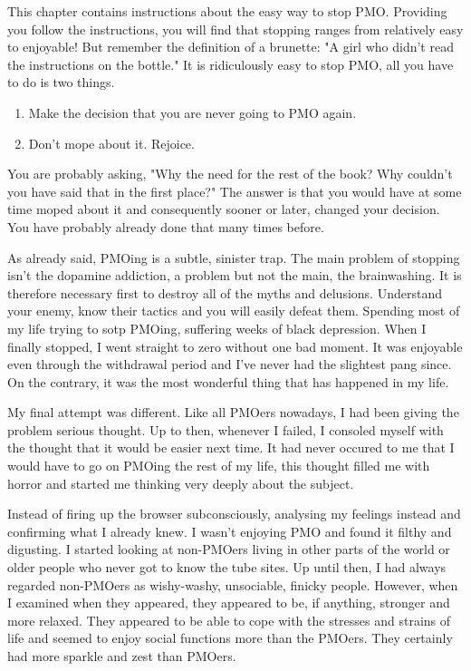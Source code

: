 \documentclass[easypeasy]{subfiles}
\begin{document}
This chapter contains instructions about the easy way to stop PMO. Providing you follow the instructions, you will find that stopping ranges from relatively easy to enjoyable! But remember the definition of a brunette: "A girl who didn't read the instructions on the bottle." It is ridiculously easy to stop PMO, all you have to do is two things.

\begin{enumerate}
  \item Make the decision that you are never going to PMO again.
  \item Don't mope about it. Rejoice.
\end{enumerate}

You are probably asking, "Why the need for the rest of the book? Why couldn't you have said that in the first place?" The answer is that you would have at some time moped about it and consequently sooner or later, changed your decision. You have probably already done that many times before.

As already said, PMOing is a subtle, sinister trap. The main problem of stopping isn't the dopamine addiction, a problem but not the main, the brainwashing. It is therefore necessary first to destroy all of the myths and delusions. Understand your enemy, know their tactics and you will easily defeat them. Spending most of my life trying to sotp PMOing, suffering weeks of black depression. When I finally stopped, I went straight to zero without one bad moment. It was enjoyable even through the withdrawal period and I've never had the slightest pang since. On the contrary, it was the most wonderful thing that has happened in my life.

My final attempt was different. Like all PMOers nowadays, I had been giving the problem serious thought. Up to then, whenever I failed, I consoled myself with the thought that it would be easier next time. It had never occured to me that I would have to go on PMOing the rest of my life, this thought filled me with horror and started me thinking very deeply about the subject.

Instead of firing up the browser subconsciously, analysing my feelings instead and confirming what I already knew. I wasn't enjoying PMO and found it filthy and digusting. I started looking at non-PMOers living in other parts of the world or older people who never got to know the tube sites. Up until then, I had always regarded non-PMOers as wishy-washy, unsociable, finicky people. However, when I examined when they appeared, they appeared to be, if anything, stronger and more relaxed. They appeared to be able to cope with the stresses and strains of life and seemed to enjoy social functions more than the PMOers. They certainly had more sparkle and zest than PMOers.
\end{document}
